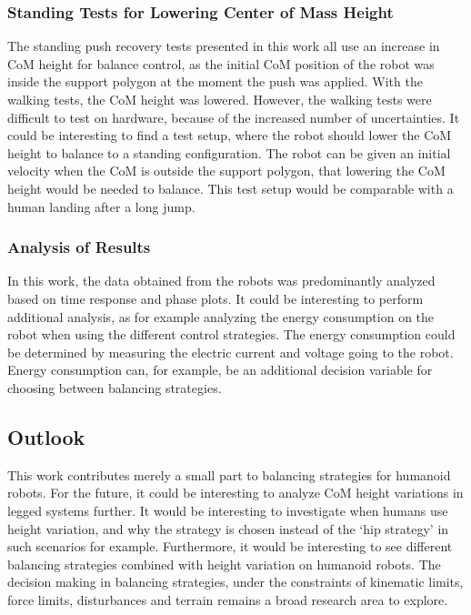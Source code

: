 \subsubsection{Standing Tests for Lowering Center of Mass Height}
The standing push recovery tests presented in this work all use an increase in \ac{CoM} height for balance control, as the initial \ac{CoM} position of the robot was inside the support polygon at the moment the push was applied. With the walking tests, the \ac{CoM} height was lowered. However, the walking tests were difficult to test on hardware, because of the increased number of uncertainties. It could be interesting to find a test setup, where the robot should lower the \ac{CoM} height to balance to a standing configuration. The robot can be given an initial velocity when the \ac{CoM} is outside the support polygon, that lowering the \ac{CoM} height would be needed to balance. This test setup would be comparable with a human landing after a long jump.
\subsubsection{Analysis of Results}
In this work, the data obtained from the robots was predominantly analyzed based on time response and phase plots. It could be interesting to perform additional analysis, as for example analyzing the energy consumption on the robot when using the different control strategies. The energy consumption could be determined by measuring the electric current and voltage going to the robot. Energy consumption can, for example, be an additional decision variable for choosing between balancing strategies.

\subsection{Outlook}
This work contributes merely a small part to balancing strategies for humanoid robots. For the future, it could be interesting to analyze \ac{CoM} height variations in legged systems further. It would be interesting to investigate when humans use height variation, and why the strategy is chosen instead of the `hip strategy' in such scenarios for example. Furthermore, it would be interesting to see different balancing strategies combined with height variation on humanoid robots. The decision making in balancing strategies, under the constraints of kinematic limits, force limits, disturbances and terrain remains a broad research area to explore.